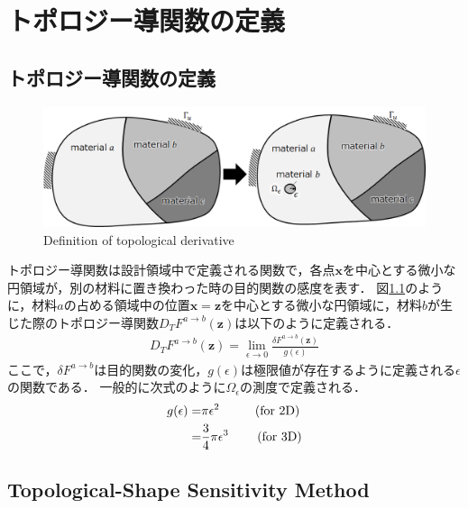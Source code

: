 \chapter{トポロジー導関数の定義}

\section{トポロジー導関数の定義}
\begin{figure}[ht]
	\begin{center}
		\includegraphics[width=13cm]{./figures/GeneHole.png}
		\caption{Definition of topological derivative}
		\label{fig:GeneHole}
	\end{center}
\end{figure}

トポロジー導関数は設計領域中で定義される関数で，各点$\bm{x}$を中心とする微小な円領域が，別の材料に置き換わった時の目的関数の感度を表す．
図\ref{fig:GeneHole}のように，材料$a$の占める領域中の位置$\bm{x}=\bm{z}$を中心とする微小な円領域に，材料$b$が生じた際のトポロジー導関数$D_{T}F^{a\rightarrow b}(\bm{z})$は以下のように定義される．
\begin{align}
D_{T}F^{a\rightarrow b}(\bm{z})=\lim_{\epsilon\rightarrow 0}\frac{\delta F^{a\rightarrow b}(\bm{z})}{g(\epsilon)}
\end{align}
ここで，$\delta F^{a\rightarrow b}$は目的関数の変化，$g(\epsilon)$は極限値が存在するように定義される$\epsilon$の関数である．
一般的に次式のように$\Omega_{\epsilon}$の測度で定義される．
\begin{align}
g(\epsilon)=&\pi\epsilon^2 \hspace{1cm}\text{(for 2D)} \\
=&\frac{3}{4}\pi\epsilon^3 \hspace{0.8cm}\text{(for 3D)}
\end{align}

\section{Topological-Shape Sensitivity Method}

